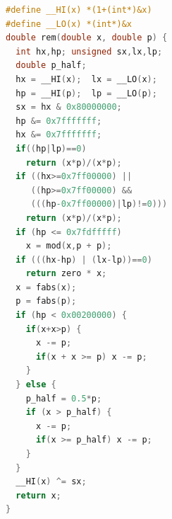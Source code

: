 \newsavebox{\tempbox}
\begin{lrbox}{\tempbox}
\begin{minipage}[b][][t]{0.44\textwidth}
\begin{lstlisting}[language=C,style=customc]
#define __HI(x) *(1+(int*)&x)
#define __LO(x) *(int*)&x
double rem(double x, double p) {
  int hx,hp; unsigned sx,lx,lp; 
  double p_half;
  hx = __HI(x);  lx = __LO(x);
  hp = __HI(p);  lp = __LO(p);
  sx = hx & 0x80000000;
  hp &= 0x7fffffff;
  hx &= 0x7fffffff;
  if((hp|lp)==0)
    return (x*p)/(x*p);
  if ((hx>=0x7ff00000) ||
     ((hp>=0x7ff00000) &&
     (((hp-0x7ff00000)|lp)!=0)))
    return (x*p)/(x*p);
  if (hp <= 0x7fdfffff)
    x = mod(x,p + p);
  if (((hx-hp) | (lx-lp))==0)
    return zero * x;
  x = fabs(x);
  p = fabs(p);
  if (hp < 0x00200000) {
    if(x+x>p) {
      x -= p;
      if(x + x >= p) x -= p;
    }
  } else {
    p_half = 0.5*p;
    if (x > p_half) {
      x -= p;
      if(x >= p_half) x -= p;
    }
  }
  __HI(x) ^= sx;
  return x;
}
\end{lstlisting}
\end{minipage}
\end{lrbox}

